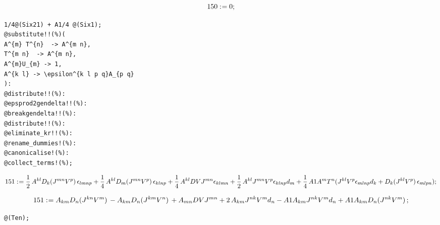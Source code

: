 \documentclass[11pt]{article}
\def\specialcolon{\mathrel{\mathop{:}}\hspace{-.5em}}
\begin{document}
\begin{dmath*}[compact, spread=2pt]
150\specialcolon{}= 0;
\end{dmath*}
{\color[named]{Blue}\begin{verbatim}
1/4@(Six21) + A1/4 @(Six1);
@substitute!!(%)(
A^{m} T^{n}  -> A^{m n},
T^{m n}  -> A^{m n},
A^{m}U_{m} -> 1,
A^{k l} -> \epsilon^{k l p q}A_{p q}
):
@distribute!!(%):
@epsprod2gendelta!!(%):
@breakgendelta!!(%):
@distribute!!(%):
@eliminate_kr!!(%):
@rename_dummies!(%):
@canonicalise!(%):
@collect_terms!(%);
\end{verbatim}}


\begin{dmath*}[compact, spread=2pt]
151\specialcolon{}= \frac{1}{2}\, {A}^{k l} {D}_{k}{({J}^{m n} {V}^{p})}\,  {\epsilon}_{l m n p} + \frac{1}{4}\, {A}^{k l} {D}_{m}{({J}^{m n} {V}^{p})}\,  {\epsilon}_{k l n p} + \frac{1}{4}\, {A}^{k l} DV {J}^{m n} {\epsilon}_{k l m n} + \frac{1}{2}\, {A}^{k l} {J}^{m n} {V}^{p} {\epsilon}_{k l n p} {d}_{m} + \frac{1}{4}\, A1 {A}^{m} {T}^{n} ({J}^{k l} {V}^{p} {\epsilon}_{m l n p} {d}_{k} + {D}_{k}{({J}^{k l} {V}^{p})}\,  {\epsilon}_{m l p n});
\end{dmath*}


\begin{dmath*}[compact, spread=2pt]
151\specialcolon{}= {A}_{k m} {D}_{n}{({J}^{k n} {V}^{m})}\,  - {A}_{k m} {D}_{n}{({J}^{k m} {V}^{n})}\,  + {A}_{m n} DV {J}^{m n} + 2\, {A}_{k m} {J}^{n k} {V}^{m} {d}_{n} - A1 {A}_{k m} {J}^{n k} {V}^{m} {d}_{n} + A1 {A}_{k m} {D}_{n}{({J}^{n k} {V}^{m})}\, ;
\end{dmath*}
{\color[named]{Blue}\begin{verbatim}
@(Ten);
\end{verbatim}}
\end{document}
